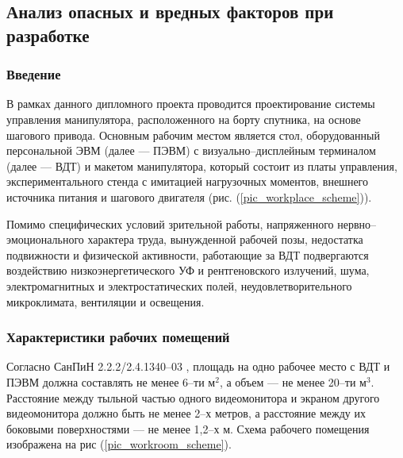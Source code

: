 \subsection{Анализ опасных и вредных факторов при разработке}

\subsubsection{Введение}

В рамках данного дипломного проекта проводится проектирование системы управления
манипулятора, расположенного на борту спутника, на основе шагового привода.
Основным рабочим местом является стол, оборудованный персональной ЭВМ
(далее --- ПЭВМ) с визуально--дисплейным терминалом (далее --- ВДТ) и макетом
манипулятора, который состоит из платы управления, экспериментального стенда с
имитацией нагрузочных моментов, внешнего источника питания и шагового двигателя
(рис. (\ref{pic_workplace_scheme})).

Помимо специфических условий зрительной работы, напряженного
нервно--эмоционального характера труда, вынужденной рабочей позы, недостатка
подвижности и физической активности, работающие за ВДТ подвергаются воздействию
низкоэнергетического УФ и рентгеновского излучений, шума, электромагнитных и
электростатических полей, неудовлетворительного микроклимата, вентиляции и
освещения.

\subsubsection{Характеристики рабочих помещений}

Согласно СанПиН 2.2.2/2.4.1340--03 \cite{ecology_sanpin_1340_03}, площадь на одно
рабочее место с ВДТ и ПЭВМ должна составлять не менее 6--ти $\text{м}^2$, а объем
--- не менее 20--ти $\text{м}^3$. Расстояние между тыльной частью одного видеомонитора
и экраном другого видеомонитора должно быть не менее 2--х метров, а расстояние
между их боковыми поверхностями --- не менее 1,2--х м. Схема рабочего помещения
изображена на рис (\ref{pic_workroom_scheme}).

